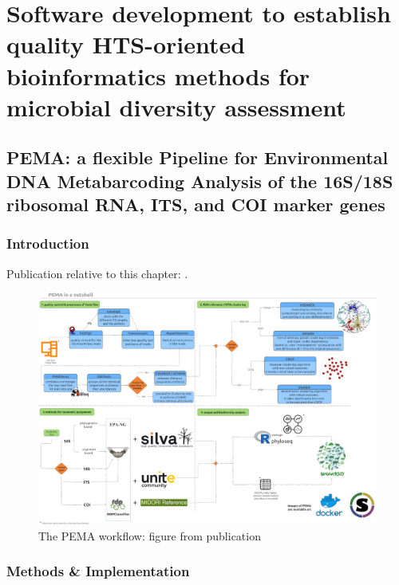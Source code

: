 % 
% 

\chapter{Software development to establish quality HTS-oriented bioinformatics methods for microbial diversity assessment}
\label{cha:2}



\section{PEMA: a flexible Pipeline for Environmental DNA Metabarcoding Analysis of the 16S/18S ribosomal RNA, ITS, and COI marker genes}


\subsection{Introduction}


Publication relative to this chapter: \cite{zafeiropoulos2020pema}. 


\begin{figure}[!htbp]
   \centering
   \includegraphics[width=0.95\columnwidth]{figures/pema_workflow.jpeg}
   \caption{The PEMA workflow: figure from publication}
\end{figure}




\subsection{Methods \& Implementation}

